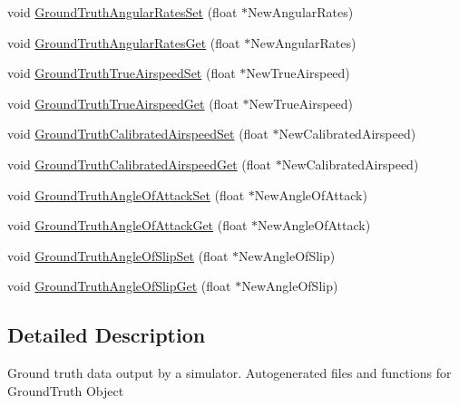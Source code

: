 \begin{DoxyCompactItemize}
void \hyperlink{group___ground_truth_ga2c68307964ffea183b3ece83ce2f8c2f}{\-Ground\-Truth\-Angular\-Rates\-Set} (float $\ast$\-New\-Angular\-Rates)
\item 
void \hyperlink{group___ground_truth_gaf5b0d3ed7318e233f88041e3be296a81}{\-Ground\-Truth\-Angular\-Rates\-Get} (float $\ast$\-New\-Angular\-Rates)
\item 
void \hyperlink{group___ground_truth_gaae1e5a6a36c9935a578f6c986742ab3b}{\-Ground\-Truth\-True\-Airspeed\-Set} (float $\ast$\-New\-True\-Airspeed)
\item 
void \hyperlink{group___ground_truth_gacc9605ed2f62c3d7b713d46322978696}{\-Ground\-Truth\-True\-Airspeed\-Get} (float $\ast$\-New\-True\-Airspeed)
\item 
void \hyperlink{group___ground_truth_ga261998672c98f2596bbd4f726aa58eff}{\-Ground\-Truth\-Calibrated\-Airspeed\-Set} (float $\ast$\-New\-Calibrated\-Airspeed)
\item 
void \hyperlink{group___ground_truth_gae173bd5cf255d9f34499deeb186add21}{\-Ground\-Truth\-Calibrated\-Airspeed\-Get} (float $\ast$\-New\-Calibrated\-Airspeed)
\item 
void \hyperlink{group___ground_truth_gae7e6aa39df98a98ad1df85b9785f9073}{\-Ground\-Truth\-Angle\-Of\-Attack\-Set} (float $\ast$\-New\-Angle\-Of\-Attack)
\item 
void \hyperlink{group___ground_truth_ga5388cfbeef3a726edd68e616171e0de7}{\-Ground\-Truth\-Angle\-Of\-Attack\-Get} (float $\ast$\-New\-Angle\-Of\-Attack)
\item 
void \hyperlink{group___ground_truth_ga7d197d0b0c592bc42205d24c2912dfa3}{\-Ground\-Truth\-Angle\-Of\-Slip\-Set} (float $\ast$\-New\-Angle\-Of\-Slip)
\item 
void \hyperlink{group___ground_truth_gacc8aab7255c093bdeb7c844bb41b33ed}{\-Ground\-Truth\-Angle\-Of\-Slip\-Get} (float $\ast$\-New\-Angle\-Of\-Slip)
\end{DoxyCompactItemize}


\subsection{\-Detailed \-Description}
\-Ground truth data output by a simulator. \-Autogenerated files and functions for \-Ground\-Truth \-Object 

